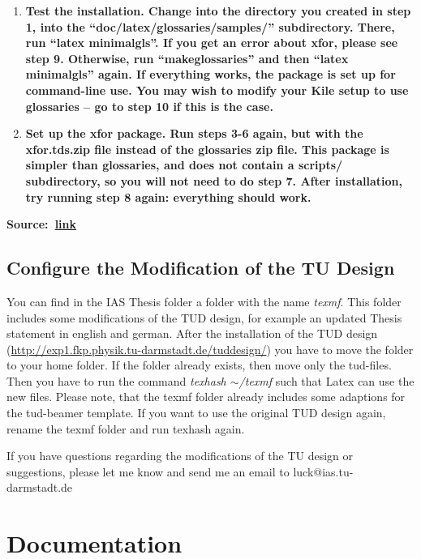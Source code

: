 \begin{enumerate}
			\item \bf{Test the installation.} Change into the directory you created in step 1, into the “doc/latex/glossaries/samples/” subdirectory. There, run “latex minimalgls”. If you get an error about xfor, please see step 9. Otherwise, run “makeglossaries” and then “latex minimalgls” again. If everything works, the package is set up for command-line use. You may wish to modify your Kile setup to use glossaries – go to step 10 if this is the case.
			\item \bf{Set up the xfor package.} Run steps 3-6 again, but with the xfor.tds.zip file instead of the glossaries zip file. This package is simpler than glossaries, and does not contain a scripts/ subdirectory, so you will not need to do step 7. After installation, try running step 8 again: everything should work.
		\end{enumerate}
		\mbox{\bf{Source:} \href{http://themindwobbles.wordpress.com/2009/12/16/using-the-glossaries-package-in-latex-and-linux-kile/}{link}}
%
%
%

	\subsection{Configure the Modification of the TU Design}
	You can find in the IAS Thesis folder a folder with the name \textit{texmf}. 			This folder includes some modifications of the TUD design, for example an updated Thesis statement in english and german.
	After the installation of the TUD design (\url{http://exp1.fkp.physik.tu-darmstadt.de/tuddesign/}) you have to move the folder to your home folder. If the folder already exists, then move only the tud-files.
	Then you have to run the command \textit{texhash $\sim$/texmf } such that Latex can use the new files.
	Please note, that the texmf folder already includes some adaptions for the tud-beamer template. If you want to use the original TUD design again, rename the texmf folder and run texhash again.
	
	If you have questions regarding the modifications of the TU design or suggestions, please let me know and send me an email to luck@ias.tu-darmstadt.de
\newpage
\section{Documentation}
%
